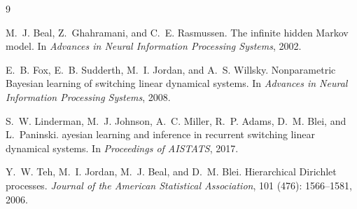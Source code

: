 \documentclass[11pt]{article}
\begin{document}

\begin{thebibliography}{9}

M.~J. Beal, Z.~Ghahramani, and C.~E. Rasmussen.
\newblock The infinite hidden {M}arkov model.
\newblock In \emph{Advances in Neural Information Processing Systems}, 2002.

E.~B. Fox, E.~B. Sudderth, M.~I. Jordan, and A.~S. Willsky.
\newblock Nonparametric {B}ayesian learning of switching linear dynamical
  systems.
\newblock In \emph{Advances in Neural Information Processing Systems}, 2008.

S.~W. Linderman, M.~J. Johnson, A.~C. Miller, R.~P. Adams, D.~M. Blei, and
  L.~Paninski.
ayesian learning and inference in recurrent switching linear
  dynamical systems.
\newblock In \emph{Proceedings of AISTATS}, 2017.

Y.~W. Teh, M.~I. Jordan, M.~J. Beal, and D.~M. Blei.
\newblock Hierarchical {D}irichlet processes.
\newblock \emph{Journal of the American Statistical Association},
  101 (476): 1566--1581, 2006.

\end{thebibliography}
\end{document}
